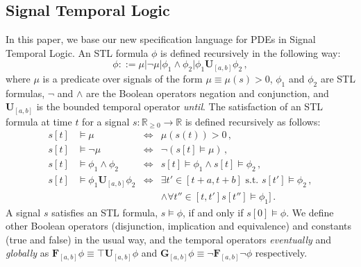 \documentclass[letterpaper, 10 pt, conference]{ieeeconf/ieeeconf}
\newcommand*{\R}{\mathbb{R}}
\newcommand{\Always}{\mathbf{G}}
\newcommand{\Event}{\mathbf{F}}
\newcommand{\luntil}{\mathbf{U}}
\begin{document}
\subsection{Signal Temporal Logic}
\label{sec:signal_temporal_logic}


In this paper, we base our new specification language for PDEs in Signal
Temporal Logic. An STL formula $\phi$ is defined recursively in the following way:
%
\begin{equation}
    \phi ::= \mu | \lnot \mu | \phi_1 \land \phi_2 | \phi_1 \luntil_{[a,b]}
    \phi_2 \,,
\end{equation}
%
where $\mu$ is a predicate over signals of the form $\mu \equiv \mu(s) > 0$,
$\phi_1$ and $\phi_2$ are STL formulas,
$\lnot$ and $\land$ are the Boolean operators negation and conjunction, and
$\luntil_{[a, b]}$ is the bounded temporal operator \emph{until}. The satisfaction
of an STL formula at time $t$ for a signal $s :
\R_{\geq 0} \to \R$ is defined recursively as follows:
%
\begin{equation}
    \begin{aligned}
        s[t] &\models \mu &\iff &\mu(s(t)) > 0 \,, \\
        s[t] &\models \lnot \mu &\iff &\lnot (s[t] \models \mu) \,, \\
        s[t] &\models \phi_1 \land \phi_2 &\iff &s[t] \models \phi_1 \land s[t]
        \models \phi_2 \,, \\
        s[t] &\models \phi_1 \luntil_{[a,b]} \phi_2 &\iff 
            &\exists t' \in [t+a, t+b] \text{ s.t. } s[t'] \models \phi_2 \,, \\
        & & &\land \forall t'' \in [t, t'] s[t''] \models \phi_1] \,.
    \end{aligned}
\end{equation}
%
A signal $s$ satisfies an STL formula, $s \models \phi$, if and
only if $s[0] \models \phi$. We define other Boolean operators (disjunction,
implication and equivalence) and constants (true and false) in the usual way, 
and the temporal operators
\emph{eventually} and \emph{globally} as $\Event_{[a, b]} \phi \equiv \top
\luntil_{[a,b]} \phi$ and $\Always_{[a, b]} \phi \equiv \lnot \Event_{[a,b]}
\lnot \phi$ respectively.
\end{document}
